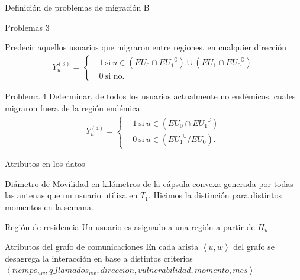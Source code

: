 \documentclass[xcolor=x11names]{beamer}
\begin{document}
\begin{frame}{Definición de problemas de migración B}
	\begin{block}{Problemas 3}

		Predecir aquellos usuarios que migraron entre regiones, en cualquier dirección
		\begin{align*}
			Y^{(3)}_u =
			\begin{cases}
				&1 \ \mbox{si} \ u \in (EU_{0} \cap { EU_{1} }^{\complement}) \cup (EU_{1} \cap { EU_{0} }^{\complement}) \\
				&0 \ \mbox{si no}.
			\end{cases}
		\end{align*}
	\end{block}

	\begin{block}{Problema 4}
		Determinar, de todos los usuarios actualmente no endémicos, cuales migraron fuera de la región endémica
		\begin{align*}
			Y^{(4)}_u =
			\begin{cases}
				& 1 \ \mbox{si} \ u \in ( EU_{0} \cap { EU_{1} }^{\complement})    \\
				& 0 \ \mbox{si} \ u \in ( { EU_{1} }^{\complement} / EU_{0}).
			\end{cases}
		\end{align*}

	\end{block}

\end{frame}


\begin{frame}{Atributos en los datos}

	\begin{block}{Diámetro de Movilidad}
		en kilómetros de la cápsula convexa generada por todas las antenas que un usuario utiliza en $T_1$. Hicimos la distinción para distintos momentos en la semana.
	\end{block}

	\begin{block}{Región de residencia}
	Un usuario es asignado a una región a partir de $H_u$
\end{block}


	\begin{block}{Atributos del grafo de comunicaciones}
		En cada arista $\left< u, w \right>$ del grafo se desagrega la interacción en base a distintos criterios
		$\left< tiempo_{uw}, q\_llamados_{uw}, direccion, vulnerabilidad, momento, mes \right>$
%
\end{block}


\end{frame}
\end{document}
